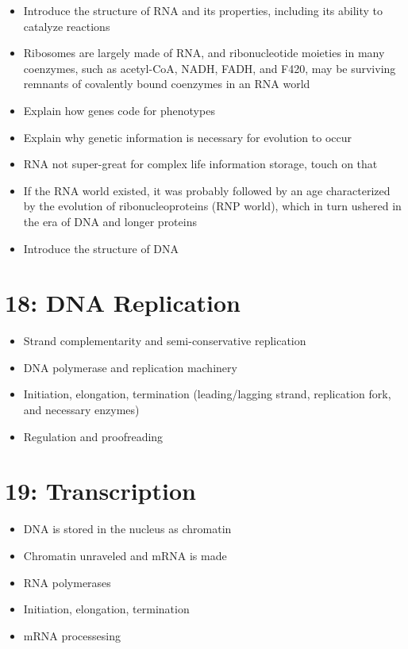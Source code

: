 \documentclass[
]{report}
\providecommand{\tightlist}{%
  \setlength{\itemsep}{0pt}\setlength{\parskip}{0pt}}
\providecommand{\tightlist}{%
  \setlength{\itemsep}{0pt}\setlength{\parskip}{0pt}}
\begin{document}
\begin{itemize}
\tightlist
\item
  Introduce the structure of RNA and its properties, including its ability to catalyze reactions
\item
  Ribosomes are largely made of RNA, and ribonucleotide moieties in many coenzymes, such as acetyl-CoA, NADH, FADH, and F420, may be surviving remnants of covalently bound coenzymes in an RNA world
\item
  Explain how genes code for phenotypes
\item
  Explain why genetic information is necessary for evolution to occur
\item
  RNA not super-great for complex life information storage, touch on that
\item
  If the RNA world existed, it was probably followed by an age characterized by the evolution of ribonucleoproteins (RNP world), which in turn ushered in the era of DNA and longer proteins
\item
  Introduce the structure of DNA
\end{itemize}

\hypertarget{dna-replication}{%
\section*{18: DNA Replication}\label{dna-replication}}

\begin{itemize}
\tightlist
\item
  Strand complementarity and semi-conservative replication
\item
  DNA polymerase and replication machinery
\item
  Initiation, elongation, termination (leading/lagging strand, replication fork, and necessary enzymes)
\item
  Regulation and proofreading
\end{itemize}

\hypertarget{transcription}{%
\section*{19: Transcription}\label{transcription}}

\begin{itemize}
\tightlist
\item
  DNA is stored in the nucleus as chromatin
\item
  Chromatin unraveled and mRNA is made
\item
  RNA polymerases
\item
  Initiation, elongation, termination
\item
  mRNA processesing
\end{itemize}
\end{document}
